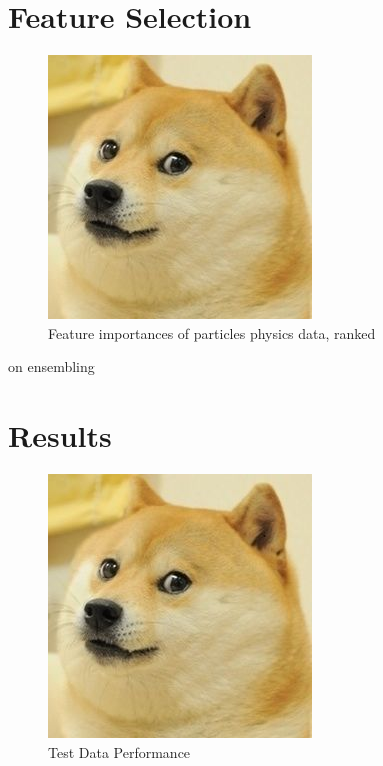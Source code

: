 \documentclass{article}
\begin{document}


\section{Feature Selection}

\begin{figure}[!h]
\centering
\includegraphics{placeholder}
\caption{Feature importances of particles physics data, ranked}
\label{fig:placeholder2}
\end{figure}


on ensembling \cite{caruana2004ensemble}


\section{Results}
\label{results}

\begin{figure}[!h]
\centering
\includegraphics{placeholder}
\caption{Test Data Performance}
\label{fig:placeholder3}
\end{figure}
\end{document}
